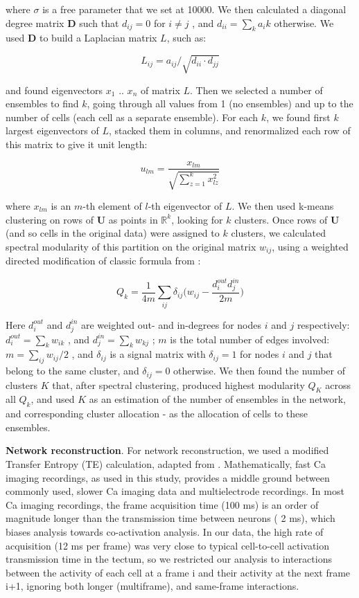 \documentclass{article}
\begin{document}
where $\sigma$ is a free parameter that we set at 10000. We then calculated a diagonal degree matrix $\textbf{D}$ such that $d_{ij} = 0$ for $i \neq j$ , and $d_{ii} = \sum_k{a_ik}$ otherwise. We used $\textbf{D}$ to build a Laplacian matrix $L$, such as:

\[ L_{ij} = a_{ij}/\sqrt{d_{ii}\cdot d_{jj}} \]

and found eigenvectors $x_1$ .. $x_n$ of matrix $L$. Then we selected a number of ensembles to find $k$, going through all values from 1 (no ensembles) and up to the number of cells (each cell as a separate ensemble). For each $k$, we found first $k$ largest eigenvectors of $L$, stacked them in columns, and renormalized each row of this matrix to give it unit length:

\[ u_{lm} = \frac{x_{lm}}{\sqrt{\sum_{z=1}^{k}{x_{lz}^2}}} \]

where $x_{lm}$ is an $m$-th element of $l$-th eigenvector of $L$. We then used k-means clustering on rows of $\textbf{U}$ as points in $\mathbb{R}^k$, looking for $k$ clusters. Once rows of $\textbf{U}$ (and so cells in the original data) were assigned to $k$ clusters, we calculated spectral modularity of this partition on the original matrix $w_{ij}$, using a weighted directed modification of classic formula from \citep{newman2006modularity}:

\[ Q_k = \frac{1}{4m}\sum_{ij}{\delta_{ij}\Big(w_{ij}-\frac{d^{out}_i d^{in}_j}{2m}}\Big) \]

Here $d^{out}_i$ and $d^{in}_j$ are weighted out- and in-degrees for nodes $i$ and $j$ respectively: $d^{out}_i = \sum_k{w_{ik}}$ , and $d^{in}_j = \sum_k{w_{kj}}$ ; $m$ is the total number of edges involved: $m = \sum_{ij}{w_{ij}}/2$ , and $\delta_{ij}$ is a signal matrix with $\delta_{ij}=1$ for nodes $i$ and $j$ that belong to the same cluster, and $\delta_{ij} = 0$ otherwise. We then found the number of clusters $K$ that, after spectral clustering, produced highest modularity $Q_K$ across all $Q_k$, and used $K$ as an estimation of the number of ensembles in the network, and corresponding cluster allocation - as the allocation of cells to these ensembles.

\textbf{Network reconstruction}. For network reconstruction, we used a modified Transfer Entropy (TE) calculation, adapted from \citep{stetter2012te,gourevitch2007te}. Mathematically, fast Ca imaging recordings, as used in this study, provides a middle ground between commonly used, slower Ca imaging data and multielectrode recordings. In most Ca imaging recordings, the frame acquisition time (100 ms) is an order of magnitude longer than the transmission time between neurons ( 2 ms), which biases analysis towards co-activation analysis. In our data, the high rate of acquisition (12 ms per frame) was very close to typical cell-to-cell activation transmission time in the tectum, so we restricted our analysis to interactions between the activity of each cell at a frame i and their activity at the next frame i+1, ignoring both longer (multiframe), and same-frame interactions.
\end{document}
